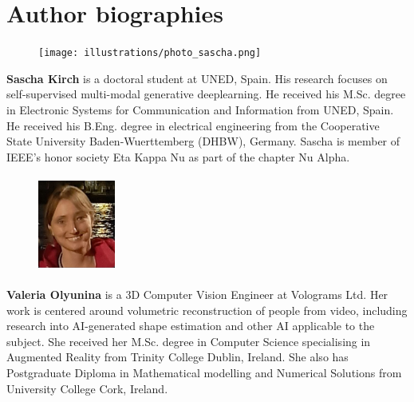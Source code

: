 \section*{Author biographies}

\setlength\intextsep{0pt} %
\begin{figure} 
    \texttt{[image: illustrations/photo\_sascha.png]}
\end{figure}\par
\noindent \textbf{Sascha Kirch} is a doctoral student at UNED, Spain. His research focuses on self-supervised multi-modal generative deeplearning. He received his M.Sc. degree in Electronic Systems for Communication and Information from UNED, Spain. He received his B.Eng. degree in electrical engineering from the Cooperative State University Baden-Wuerttemberg (DHBW), Germany. Sascha is member of IEEE’s honor society Eta Kappa Nu as part of the chapter Nu Alpha.\\

\setlength\intextsep{0pt} %
\begin{figure} 
    \includegraphics[width=1in,height=1.25in,clip,keepaspectratio]{illustrations/photo_val.jpg}
\end{figure}\par
\noindent \textbf{Valeria Olyunina} is a 3D Computer Vision Engineer at Volograms Ltd. Her work is centered around volumetric reconstruction of people from video, including research into AI-generated shape estimation and other AI applicable to the subject. She received her M.Sc. degree in Computer Science specialising in Augmented Reality from Trinity College Dublin, Ireland. She also has Postgraduate Diploma in Mathematical modelling and Numerical Solutions from University College Cork, Ireland.\\

